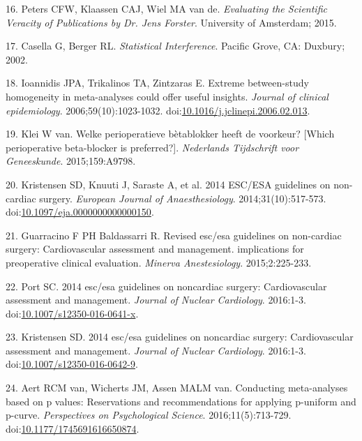 \documentclass[]{article}
\begin{document}
\hypertarget{ref-peters2015}{}
16. Peters CFW, Klaassen CAJ, Wiel MA van de. \emph{Evaluating the
Scientific Veracity of Publications by Dr. Jens Forster}. University of
Amsterdam; 2015.

\hypertarget{ref-casella2002}{}
17. Casella G, Berger RL. \emph{Statistical Interference}. Pacific
Grove, CA: Duxbury; 2002.

\hypertarget{ref-ioannidis2006}{}
18. Ioannidis JPA, Trikalinos TA, Zintzaras E. Extreme between-study
homogeneity in meta-analyses could offer useful insights. \emph{Journal
of clinical epidemiology}. 2006;59(10):1023-1032.
doi:\href{https://doi.org/10.1016/j.jclinepi.2006.02.013}{10.1016/j.jclinepi.2006.02.013}.

\hypertarget{ref-klei2015}{}
19. Klei W van. Welke perioperatieve bètablokker heeft de voorkeur?
{[}Which perioperative beta-blocker is preferred?{]}. \emph{Nederlands
Tijdschrift voor Geneeskunde}. 2015;159:A9798.

\hypertarget{ref-Kristensen_2014}{}
20. Kristensen SD, Knuuti J, Saraste A, et al. 2014 ESC/ESA guidelines
on non-cardiac surgery. \emph{European Journal of Anaesthesiology}.
2014;31(10):517-573.
doi:\href{https://doi.org/10.1097/eja.0000000000000150}{10.1097/eja.0000000000000150}.

\hypertarget{ref-guarracino2015}{}
21. Guarracino F PH Baldassarri R. Revised esc/esa guidelines on
non-cardiac surgery: Cardiovascular assessment and management.
implications for preoperative clinical evaluation. \emph{Minerva
Anestesiology}. 2015;2:225-233.

\hypertarget{ref-Port2016}{}
22. Port SC. 2014 esc/esa guidelines on noncardiac surgery:
Cardiovascular assessment and management. \emph{Journal of Nuclear
Cardiology}. 2016:1-3.
doi:\href{https://doi.org/10.1007/s12350-016-0641-x}{10.1007/s12350-016-0641-x}.

\hypertarget{ref-Kristensen2016}{}
23. Kristensen SD. 2014 esc/esa guidelines on noncardiac surgery:
Cardiovascular assessment and management. \emph{Journal of Nuclear
Cardiology}. 2016:1-3.
doi:\href{https://doi.org/10.1007/s12350-016-0642-9}{10.1007/s12350-016-0642-9}.

\hypertarget{ref-van_Aert_2016}{}
24. Aert RCM van, Wicherts JM, Assen MALM van. Conducting meta-analyses
based on p values: Reservations and recommendations for applying
p-uniform and p-curve. \emph{Perspectives on Psychological Science}.
2016;11(5):713-729.
doi:\href{https://doi.org/10.1177/1745691616650874}{10.1177/1745691616650874}.
\end{document}
